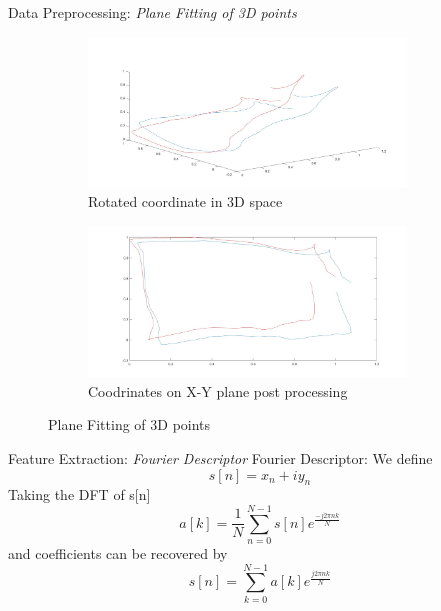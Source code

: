 \documentclass[10pt]{beamer}
\begin{document}
\begin{frame}{Data Preprocessing: \textit{Plane Fitting of 3D points} }
\begin{figure}
    \centering
    \begin{subfigure}[b]{0.4\textwidth}
        \includegraphics[width=\textwidth,height = 4cm]{rotated_3d_plot}
        \caption{Rotated coordinate in 3D space}
    \end{subfigure}
    \begin{subfigure}[b]{0.4\textwidth}
        \includegraphics[width=\textwidth,height = 4cm]{rotated_2d_plot}
        \caption{Coodrinates on X-Y plane post processing}
    \end{subfigure}
    \caption{Plane Fitting of 3D points}\label{fig:3dpts}
\end{figure}
\end{frame}

\begin{frame}{Feature Extraction: \textit{Fourier Descriptor} }
Fourier Descriptor:
We define
\begin{equation*}
s[n] = x_n + iy_n
\end{equation*}
Taking the DFT of s[n]
\begin{equation}
a[k] = \frac{1}{N}\sum_{n=0}^{N-1}s[n]e^{\frac{-j2\pi n k}{N}}
\end{equation}
and coefficients can be recovered by 
\begin{equation}
s[n] = \sum_{k=0}^{N-1}a[k]e^{\frac{j2\pi n k}{N}}
\end{equation}
\end{frame}
\end{document}
